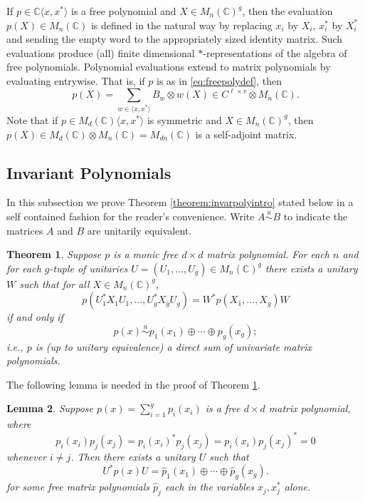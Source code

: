 \documentclass[12pt,makeidx]{amsart}
\newcommand{\simu}{\stackrel u{\sim}}
\newtheorem{theorem}{Theorem}[section]
\newtheorem{lemma}[theorem]{Lemma}
\def\beq{\begin{equation}}
\def\eeq{\end{equation}}
\numberwithin{equation}{section}
\def\C{ {\mathbb{C}} }
\begin{document}
If $p \in \C \langle x,x^* \rangle$ is a free 
polynomial and $X \in M_n(\C)^g$, then the evaluation $p(X) \in M_{n}(\C)$ 
is defined in the natural way by replacing $x_i$ by $X_i$,
$x_i^*$ by $X_i^*$ and sending the empty word to
 the appropriately sized identity matrix. Such evaluations produce (all) finite dimensional
 $*$-representations of the algebra of free polynomials. 
Polynomial evaluations extend to matrix polynomials by evaluating entrywise. 
That is, if $p$ is as in \eqref{eq:freepolydef}, then
\[
p(X)=\sum_{w \in \langle x,x^* \rangle} B_w \otimes w(X) \in C^{\ell \times v}\otimes M_n(\C). 
\]
Note that if $p \in M_d(\C) \langle x, x^* \rangle$ is symmetric and
 $X \in M_n(\C)^g$, then $p(X) \in  M_d(\C)\otimes M_n(\C)=M_{dn}(\C)$ is a self-adjoint 
 matrix. 

\subsection{Invariant Polynomials}
\label{sec:IPs}
In this subsection we prove Theorem \ref{theorem:invarpolyintro} stated below in a self contained fashion for the reader's convenience. Write $A\simu B$ to indicate the matrices $A$ and $B$ are unitarily equivalent.

 \begin{theorem} 
\label{theorem:invarpoly}
Suppose $p$ is a monic free $d \times d$ matrix polynomial. For each $n$ and for each $g$-tuple of unitaries $U=(U_1, \dots, U_g) \in M_n(\C)^g$ there exists a unitary $W$ such that for all 
$X\in M_n(\C)^g$, 
\[
 p(U_1^*X_1U_1,\dots,U_g^* X_g U_g) =W^* p(X_1,\dots,X_g) W 
\]
 if and only if 
\beq
 \label{eq:invarpoly}
p(x)\simu 
p_1(x_1) \oplus \cdots \oplus p_g(x_g); 
\eeq
i.e.,  $p$ is (up to unitary equivalence) a direct sum of univariate matrix polynomials. 
\end{theorem}

The following lemma  is needed in the proof of Theorem \ref{theorem:invarpoly}.

\begin{lemma}
\label{lemma:polydirectsumnonsym}
Suppose $p(x)=\sum_{i=1}^g p_i (x_i)$ is a free 
$d\times d$
matrix polynomial, where 
\beq\label{eq:62}
p_i(x_i) p_j (x_j)= p_i(x_i)^* p_j (x_j) =p_i(x_i)p_j (x_j)^* =0
\eeq
 whenever $i \neq j$. Then there exists a unitary $U$ such that 
\beq\label{eq:Ublock}
U^*p(x)U= 
\hat{p}_1 (x_1) \oplus \cdots \oplus \hat{p}_g(x_g). 
\eeq
for some free matrix polynomials $\hat{p}_j$ each in the variables $x_j,x_j^*$ alone.
\end{lemma}
\end{document}
